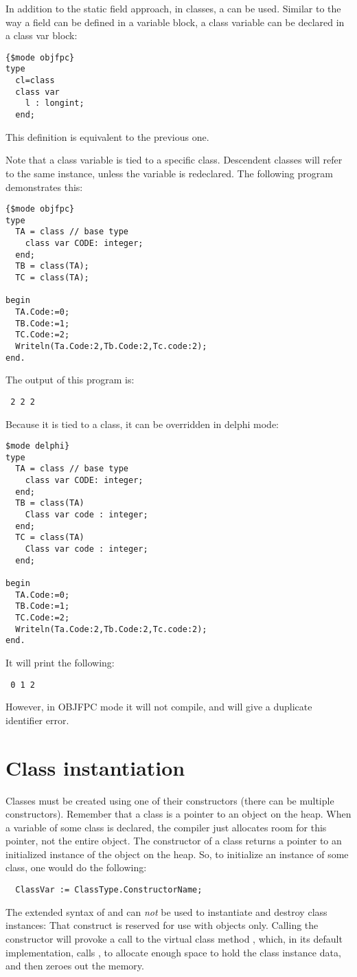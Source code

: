 In addition to the static field approach, in classes, a  can be used.
Similar to the way a field can be defined in a variable block, a class variable can
be declared in a class var block:
\begin{verbatim}
{$mode objfpc}
type
  cl=class
  class var
    l : longint;
  end;
\end{verbatim}
This definition is equivalent to the previous one.

Note that a class variable is tied to a specific class. Descendent classes
will refer to the same instance, unless the variable is redeclared.
The following program demonstrates this:
\begin{verbatim}
{$mode objfpc}
type
  TA = class // base type
    class var CODE: integer;
  end;
  TB = class(TA);
  TC = class(TA);

begin
  TA.Code:=0;
  TB.Code:=1;
  TC.Code:=2;
  Writeln(Ta.Code:2,Tb.Code:2,Tc.code:2);
end.
\end{verbatim}
The output of this program is:
\begin{verbatim}
 2 2 2
\end{verbatim}
Because it is tied to a class, it can be overridden in delphi mode:
\begin{verbatim}
$mode delphi}
type
  TA = class // base type
    class var CODE: integer;
  end;
  TB = class(TA)
    Class var code : integer;
  end;
  TC = class(TA)
    Class var code : integer;
  end;

begin
  TA.Code:=0;
  TB.Code:=1;
  TC.Code:=2;
  Writeln(Ta.Code:2,Tb.Code:2,Tc.code:2);
end.
\end{verbatim}
It will print the following:
\begin{verbatim}
 0 1 2
\end{verbatim}
However, in OBJFPC mode it will not compile, and will give a duplicate
identifier error.

\section{Class instantiation}
\label{se:classinstantiation}
Classes must be created using one of their constructors (there can be
multiple constructors). Remember that a class is a pointer to an object on
the heap. When a variable of some class is declared, the compiler just
allocates room for this pointer, not the entire object. The constructor of
a class returns a pointer to an initialized instance of the object on the
heap. So, to initialize an instance of some class, one would do the following:
\begin{verbatim}
  ClassVar := ClassType.ConstructorName;
\end{verbatim}
The extended syntax of  and  can {\em not} be used to
instantiate and destroy class instances:
That construct is reserved for use with objects only.
Calling the constructor will provoke a call to the virtual class method
, which, in its default implementation, calls , to allocate
enough space to hold the class instance data, and then zeroes out the memory.

